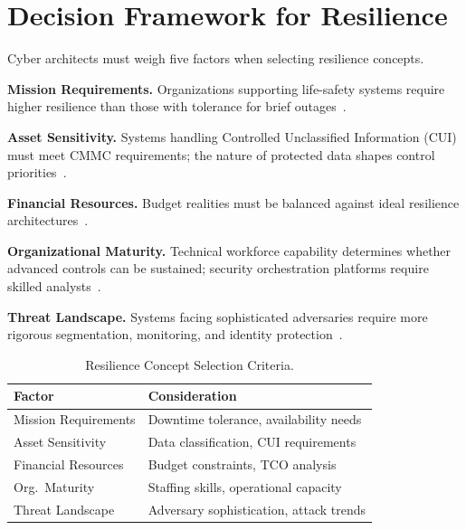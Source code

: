 \documentclass[sigconf,nonacm]{acmart}
\begin{document}
\section{Decision Framework for Resilience}

Cyber architects must weigh five factors when selecting resilience concepts.

\textbf{Mission Requirements.} Organizations supporting life-safety systems require
higher resilience than those with tolerance for brief outages~\cite{guidehouse2023}.

\textbf{Asset Sensitivity.} Systems handling Controlled Unclassified Information (CUI)
must meet CMMC requirements; the nature of protected data shapes control
priorities~\cite{dod2021cmmc}.

\textbf{Financial Resources.} Budget realities must be balanced against ideal resilience
architectures~\cite{metricstream2024,fortinet2024}.

\textbf{Organizational Maturity.} Technical workforce capability determines whether
advanced controls can be sustained; security orchestration platforms require skilled
analysts~\cite{guidehouse2023}.

\textbf{Threat Landscape.} Systems facing sophisticated adversaries require more rigorous
segmentation, monitoring, and identity protection~\cite{isaca2024}.

\begin{table}[h]
\caption{Resilience Concept Selection Criteria.}
\label{tab:selection}
\small
\begin{tabularx}{\columnwidth}{@{}p{2.4cm}X@{}}
\toprule
\textbf{Factor} & \textbf{Consideration} \\
\midrule
Mission Requirements  & Downtime tolerance, availability needs \\
\addlinespace[3pt]
Asset Sensitivity     & Data classification, CUI requirements \\
\addlinespace[3pt]
Financial Resources   & Budget constraints, TCO analysis \\
\addlinespace[3pt]
Org.\ Maturity        & Staffing skills, operational capacity \\
\addlinespace[3pt]
Threat Landscape      & Adversary sophistication, attack trends \\
\bottomrule
\end{tabularx}
\end{table}
\end{document}
